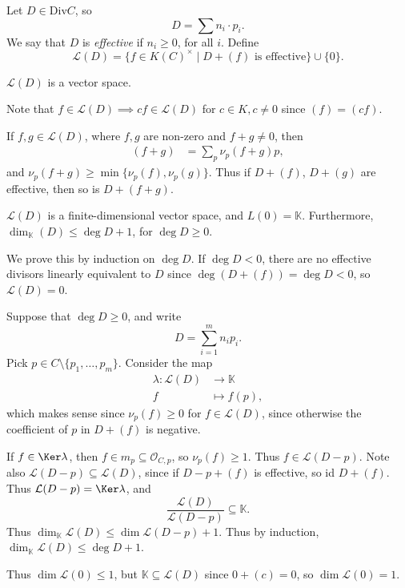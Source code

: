 \documentclass[12pt]{article}
\begin{document}
Let $D \in \mathrm{Div} C$, so
\[
D = \sum n_i \cdot p_i.
\]
We say that $D$ is \emph{effective} if $n_i \geq 0$, for all $i$. Define
\[
	\mathcal{L} (D) = \{ f \in K(C)^{\times} \mid D + (f) \text{ is effective}\} \cup \{0\}.
\]

\begin{lemma}
	$\mathcal{L}(D)$ is a vector space.
\end{lemma}

\begin{proofbox}
	Note that $f \in \mathcal{L}(D) \implies cf \in \mathcal{L}(D)$ for $c \in K, c \neq 0$ since $(f) = (cf)$.

	If $f, g \in \mathcal{L}(D)$, where $f, g$ are non-zero and $f + g \neq 0$, then
	\begin{align*}
		(f + g) &= \sum_{p} \nu_p (f + g) p,
	\end{align*}
	and $\nu_p(f + g) \geq \min\{\nu_p(f), \nu_p(g)\}$. Thus if $D + (f)$, $D + (g)$ are effective, then so is $D + (f + g)$.
\end{proofbox}

\begin{theorem}
	$\mathcal{L}(D)$ is a finite-dimensional vector space, and $L(0) = \mathbb{K}$. Furthermore, $\dim_{\mathbb{K}}(D) \leq \deg D + 1$, for $\deg D \geq 0$.
\end{theorem}

\begin{proofbox}
	We prove this by induction on $\deg D$. If $\deg D < 0$, there are no effective divisors linearly equivalent to $D$ since $\deg (D + (f)) = \deg D < 0$, so $\mathcal{L}(D) = 0$.

	Suppose that $\deg D \geq 0$, and write
	\[
	D = \sum_{i = 1}^m n_i p_i.
	\]
	Pick $p \in C \setminus \{p_1, \ldots, p_m\}$. Consider the map
	\begin{align*}
		\lambda : \mathcal{L}(D) &\to \mathbb{K} \\
		f &\mapsto f(p),
	\end{align*}
	which makes sense since $\nu_p(f) \geq 0$ for $f \in \mathcal{L}(D)$, since otherwise the coefficient of $p$ in $D + (f)$ is negative.

	If $f \in \Ker \lambda$, then $f \in m_p \subseteq \mathcal{O}_{C, p}$, so $\nu_p(f) \geq 1$. Thus $f \in \mathcal{L}(D - p)$. Note also $\mathcal{L}(D - p) \subseteq \mathcal{L}(D)$, since if $D - p + (f)$ is effective, so id $D + (f)$. Thus $\mathcal{L}(D - p) = \Ker \lambda$, and
	\[
	\frac{\mathcal{L}(D)}{\mathcal{L}(D - p)} \subseteq \mathbb{K}.
	\]
	Thus $\dim_{\mathbb{K}} \mathcal{L}(D) \leq \dim \mathcal{L}(D - p) + 1$. Thus by induction, $\dim_{\mathbb{K}} \mathcal{L}(D) \leq \deg D + 1$.

	Thus $\dim \mathcal{L}(0) \leq 1$, but $\mathbb{K} \subseteq \mathcal{L}(D)$ since $0 + (c) = 0$, so $\dim \mathcal{L}(0) = 1$.
\end{proofbox}
\end{document}
